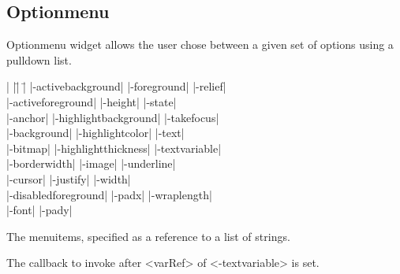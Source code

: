 \subsection*{Optionmenu}
Optionmenu widget allows the user chose between a given set of options
using a pulldown list.
\vskip5pt
\vspace{-4pt}

\begin{tabbing}
|                    |\=|                    |\= \kill
|-activebackground| \> |-foreground|         \> |-relief| \\
|-activeforeground| \> |-height|             \> |-state| \\
|-anchor|           \> |-highlightbackground|\> |-takefocus| \\
|-background|       \> |-highlightcolor|     \> |-text| \\
|-bitmap|           \> |-highlightthickness| \> |-textvariable| \\
|-borderwidth|      \> |-image|              \> |-underline| \\
|-cursor|           \> |-justify|            \> |-width| \\
|-disabledforeground| \> |-padx| 	     \> |-wraplength| \\
|-font| 	    \> |-pady| \\
\end{tabbing}

\vskip5pt
\begin{enum}{1cm}

 The menuitems, specified as a
reference to a list of strings.

 The callback to invoke after <varRef> of <-textvariable> is set.
 
\end{enum}


